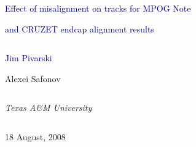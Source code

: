 \documentclass[compress]{beamer}
\begin{document}
\begin{frame}
\vfill
\begin{center}
\textcolor{darkblue}{\Large Effect of misalignment on tracks for MPOG Note}

\vspace{0.2 cm}
\textcolor{darkblue}{\Large and CRUZET endcap alignment results}

\vfill
\begin{columns}
\begin{center}
{\Large
\textcolor{darkblue}{Jim Pivarski}}

\vspace{0.2 cm}
Alexei Safonov
\end{center}

\end{columns}

\begin{columns}
\begin{center}
\scriptsize
{\it Texas A\&M University}
\end{center}
\end{columns}

\vfill
18 August, 2008

\end{center}
\end{frame}

\end{document}
